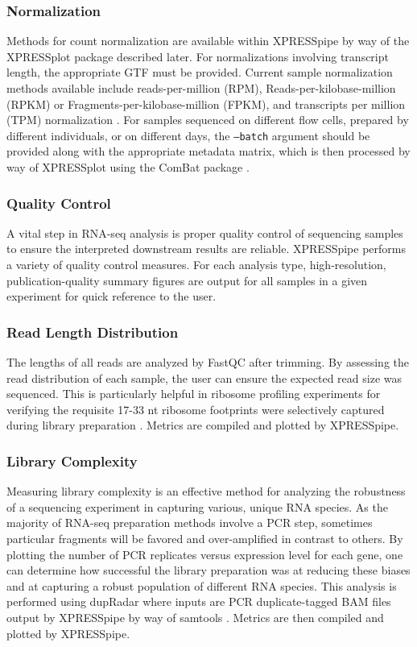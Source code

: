 \documentclass[10pt, oneside]{article}
\begin{document}
\subsubsection{Normalization}
Methods for count normalization are available within XPRESSpipe by way of the XPRESSplot package described later. For normalizations involving transcript length, the appropriate GTF must be provided. Current sample normalization methods available include reads-per-million (RPM), Reads-per-kilobase-million (RPKM) or Fragments-per-kilobase-million (FPKM), and transcripts per million (TPM) normalization \cite{evans_briefbio}. For samples sequenced on different flow cells, prepared by different individuals, or on different days, the \texttt{--batch} argument should be provided along with the appropriate metadata matrix, which is then processed by way of XPRESSplot using the ComBat package \cite{sva}.

\subsubsection{Quality Control}
  A vital step in RNA-seq analysis is proper quality control of sequencing samples to ensure the interpreted downstream results are reliable. XPRESSpipe performs a variety of quality control measures. For each analysis type, high-resolution, publication-quality summary figures are output for all samples in a given experiment for quick reference to the user.

\subsubsection{Read Length Distribution}
The lengths of all reads are analyzed by FastQC \cite{fastqc} after trimming. By assessing the read distribution of each sample, the user can ensure the expected read size was sequenced. This is particularly helpful in ribosome profiling experiments for verifying the requisite 17-33 nt ribosome footprints were selectively captured during library preparation \cite{ingolia_meth, fp_range}. Metrics are compiled and plotted by XPRESSpipe.

\subsubsection{Library Complexity}
Measuring library complexity is an effective method for analyzing the robustness of a sequencing experiment in capturing various, unique RNA species. As the majority of RNA-seq preparation methods involve a PCR step, sometimes particular fragments will be favored and over-amplified in contrast to others. By plotting the number of PCR replicates versus expression level for each gene, one can determine how successful the library preparation was at reducing these biases and at capturing a robust population of different RNA species. This analysis is performed using dupRadar \cite{dupradar} where inputs are PCR duplicate-tagged BAM files output by XPRESSpipe by way of samtools \cite{samtools}. Metrics are then compiled and plotted by XPRESSpipe.
\end{document}
